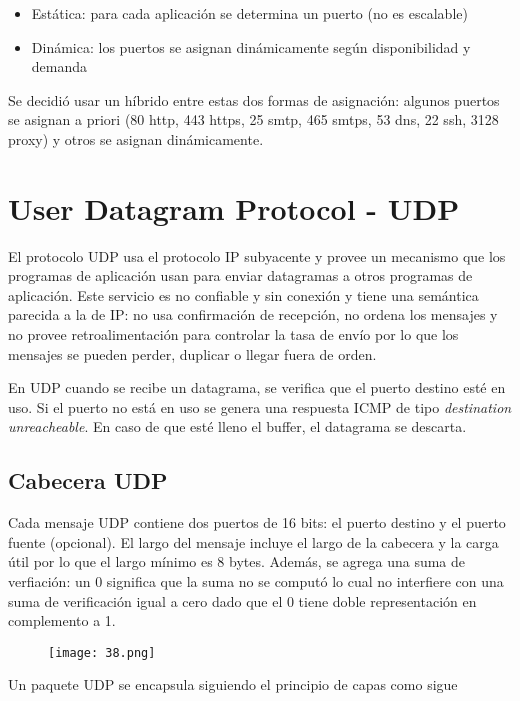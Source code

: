 \documentclass{book}
\begin{document}
	\begin{itemize}
		\item Estática: para cada aplicación se determina un puerto (no es escalable)
		\item Dinámica: los puertos se asignan dinámicamente según disponibilidad y demanda
	\end{itemize}
	
	Se decidió usar un híbrido entre estas dos formas de asignación: algunos puertos se asignan a priori (80 http, 443 https, 25 smtp, 465 smtps, 53 dns, 22 ssh, 3128 proxy) y otros se asignan dinámicamente.
	
	\section{User Datagram Protocol - UDP}
	El protocolo UDP usa el protocolo IP subyacente y provee un mecanismo que los programas de aplicación usan para enviar datagramas a otros programas de aplicación. Este servicio es no confiable y sin conexión y tiene una semántica parecida a la de IP: no usa confirmación de recepción, no ordena los mensajes y no provee retroalimentación para controlar la tasa de envío por lo que los mensajes se pueden perder, duplicar o llegar fuera de orden.
	
	\vspace{3mm}
	En UDP cuando se recibe un datagrama, se verifica que el puerto destino esté en uso. Si el puerto no está en uso se genera una respuesta ICMP de tipo \textit{destination unreacheable}. En caso de que esté lleno el buffer, el datagrama se descarta.
	
	\pagebreak
	\subsection{Cabecera UDP}
	Cada mensaje UDP contiene dos puertos de 16 bits: el puerto destino y el puerto fuente (opcional). El largo del mensaje incluye el largo de la cabecera y la carga útil por lo que el largo mínimo es 8 bytes. Además, se agrega una suma de verfiación: un 0 significa que la suma no se computó lo cual no interfiere con una suma de verificación igual a cero dado que el 0 tiene doble representación en complemento a 1.
	
	\begin{figure}[H]
		\centering
		\texttt{[image: 38.png]}
	\end{figure}
	
	Un paquete UDP se encapsula siguiendo el principio de capas como sigue
	
\end{document}
